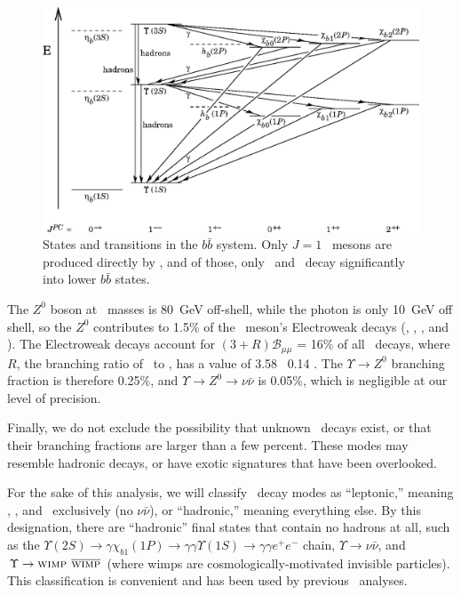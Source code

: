 \documentclass{cornell}
\begin{document}
\begin{figure}
  \begin{center}
    \includegraphics[width=0.9\linewidth]{bbtransitions}
  \end{center}
  \caption[States and transitions in the $b\bar{b}$
  system]{\label{bbtransitions} States and transitions in the
  $b\bar{b}$ system.  Only $J=1$ \ups\ mesons are produced directly by
  \ee, and of those, only \uss\ and \usss\ decay significantly into
  lower $b\bar{b}$ states.}
\end{figure}

The $Z^0$ boson at \ups\ masses is 80~GeV off-shell, while the photon
is only 10~GeV off shell, so the $Z^0$ contributes to 1.5\% of the
\ups\ meson's Electroweak decays (\ee, \mumu, \tautau, and \qqbar).
The Electroweak decays account for $(3+R){\mathcal B}_{\mu\mu}$ = 16\%
of all \ups\ decays, where $R$, the branching ratio of \qqbar\ to
\mumu, has a value of 3.58 \PM\ 0.14 \cite{novor}.  The $\Upsilon \to
Z^0$ branching fraction is therefore 0.25\%, and $\Upsilon \to Z^0 \to
\nu\bar{\nu}$ is 0.05\%, which is negligible at our level of
precision.

Finally, we do not exclude the possibility that unknown \ups\ decays
exist, or that their branching fractions are larger than a few
percent.  These modes may resemble hadronic decays, or have exotic
signatures that have been overlooked.

For the sake of this analysis, we will classify \ups\ decay modes as
``leptonic,'' meaning \ee, \mumu, and \tautau\ exclusively (no
$\nu\bar{\nu}$), or ``hadronic,'' meaning everything else.  By this
designation, there are ``hadronic'' final states that contain no
hadrons at all, such as the $\Upsilon(2S) \to \gamma \chi_{b1}(1P) \to
\gamma\gamma \Upsilon(1S) \to \gamma\gamma e^+e^-$ chain, $\Upsilon
\to \nu\bar{\nu}$, and $\Upsilon \to \mbox{\sc wimp }
\overline{\mbox{\sc wimp}}$ (where {\sc wimp}s are
cosmologically-motivated invisible particles).  This classification is
convenient and has been used by previous \gee\ analyses.
\end{document}
